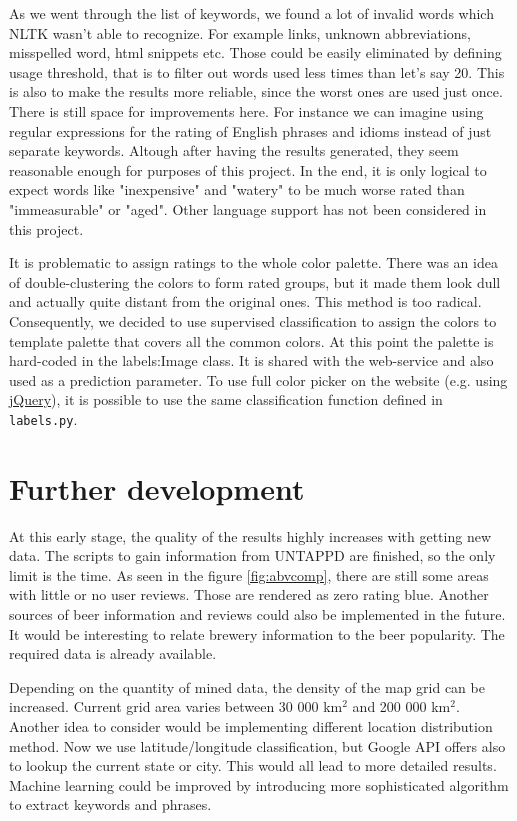\documentclass[10pt]{IEEEtran}
\begin{document}
As we went through the list of keywords, we found a lot of invalid words which NLTK wasn't able to recognize. For example links, unknown abbreviations, misspelled word, html snippets etc. Those could be easily eliminated by defining usage threshold, that is to filter out words used less times than let's say 20. This is also to make the results more reliable, since the worst ones are used just once. There is still space for improvements here. For instance we can imagine using regular expressions for the rating of English phrases and idioms instead of just separate keywords. Altough after having the results generated, they seem reasonable enough for purposes of this project. In the end, it is only logical to expect words like "inexpensive" and "watery" to be much worse rated than "immeasurable" or "aged". Other language support has not been considered in this project.

It is problematic to assign ratings to the whole color palette. There was an idea of double-clustering the colors to form rated groups, but it made them look dull and actually quite distant from the original ones. This method is too radical. Consequently, we decided to use supervised classification to assign the colors to template palette that covers all the common colors. At this point the palette is hard-coded in the labels:Image class. It is shared with the web-service and also used as a prediction parameter. To use full color picker on the website (e.g. using  \href{http://jquery.com/}{jQuery}), it is possible to use the same classification function defined in \texttt{labels.py}.

\section{Further development}
At this early stage, the quality of the results highly increases with getting new data. The scripts to gain information from UNTAPPD are finished, so the only limit is the time. As seen in the figure \ref{fig:abvcomp}, there are still some areas with little or no user reviews. Those are rendered as zero rating blue. Another sources of beer information and reviews could also be implemented in the future. 
It would be interesting to relate brewery information to the beer popularity. The required data is already available.

Depending on the quantity of mined data, the density of the map grid can be increased. Current grid area varies between 30 000 km$^2$ and 200 000 km$^2$. Another idea to consider would be implementing different location distribution method. Now we use latitude/longitude classification, but Google API offers also to lookup the current state or city. This would all lead to more detailed results. Machine learning could be improved by introducing more sophisticated algorithm to extract keywords and phrases. 
\end{document}
